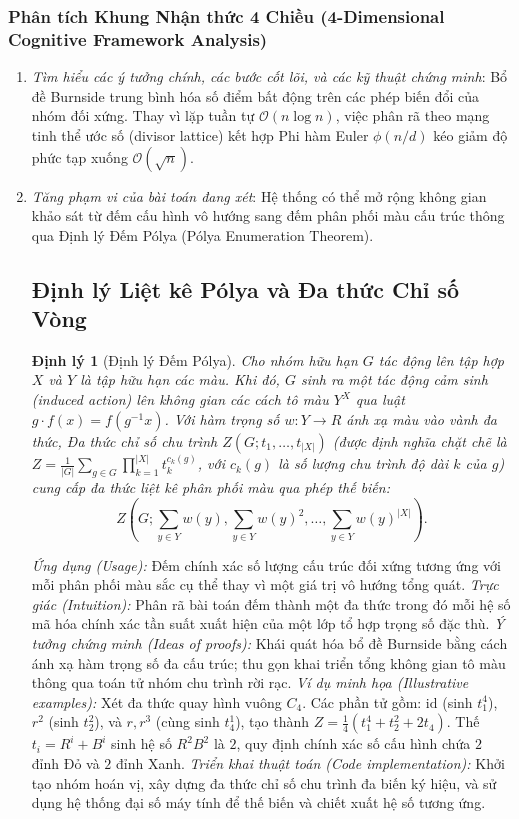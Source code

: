 \documentclass{article}
\newtheorem{dinhly}{Định lý}
\begin{document}
\subsubsection*{Phân tích Khung Nhận thức 4 Chiều (4-Dimensional Cognitive Framework Analysis)}
\begin{enumerate}
 \item \textit{Tìm hiểu các ý tưởng chính, các bước cốt lõi, và các kỹ thuật chứng minh}: Bổ đề Burnside trung bình hóa số điểm bất động trên các phép biến đổi của nhóm đối xứng. Thay vì lặp tuần tự $\mathcal{O}(n \log n)$, việc phân rã theo mạng tinh thể ước số (divisor lattice) kết hợp Phi hàm Euler $\phi(n/d)$ kéo giảm độ phức tạp xuống $\mathcal{O}(\sqrt{n})$.
 \item \textit{Tăng phạm vi của bài toán đang xét}: Hệ thống có thể mở rộng không gian khảo sát từ đếm cấu hình vô hướng sang đếm phân phối màu cấu trúc thông qua Định lý Đếm Pólya (Pólya Enumeration Theorem).

\subsection{Định lý Liệt kê Pólya và Đa thức Chỉ số Vòng}

\begin{dinhly}[Định lý Đếm Pólya]
Cho nhóm hữu hạn $G$ tác động lên tập hợp $X$ và $Y$ là tập hữu hạn các màu. Khi đó, $G$ sinh ra một tác động cảm sinh (induced action) lên không gian các cách tô màu $Y^X$ qua luật $g \cdot f(x) = f(g^{-1}x)$. Với hàm trọng số $w: Y \to R$ ánh xạ màu vào vành đa thức, Đa thức chỉ số chu trình $Z(G; t_1, \dots, t_{|X|})$ (được định nghĩa chặt chẽ là $Z = \frac{1}{|G|} \sum_{g \in G} \prod_{k=1}^{|X|} t_k^{c_k(g)}$, với $c_k(g)$ là số lượng chu trình độ dài $k$ của $g$) cung cấp đa thức liệt kê phân phối màu qua phép thế biến:
\begin{equation*}
 Z(G; \sum_{y \in Y} w(y), \sum_{y \in Y} w(y)^2, \dots, \sum_{y \in Y} w(y)^{|X|}).
\end{equation*}
\end{dinhly}
\emph{Ứng dụng (Usage):} Đếm chính xác số lượng cấu trúc đối xứng tương ứng với mỗi phân phối màu sắc cụ thể thay vì một giá trị vô hướng tổng quát.
\emph{Trực giác (Intuition):} Phân rã bài toán đếm thành một đa thức trong đó mỗi hệ số mã hóa chính xác tần suất xuất hiện của một lớp tổ hợp trọng số đặc thù.
\emph{Ý tưởng chứng minh (Ideas of proofs):} Khái quát hóa bổ đề Burnside bằng cách ánh xạ hàm trọng số đa cấu trúc; thu gọn khai triển tổng không gian tô màu thông qua toán tử nhóm chu trình rời rạc.
\emph{Ví dụ minh họa (Illustrative examples):} Xét đa thức quay hình vuông $C_4$. Các phần tử gồm: $\text{id}$ (sinh $t_1^4$), $r^2$ (sinh $t_2^2$), và $r, r^3$ (cùng sinh $t_4^1$), tạo thành $Z = \frac{1}{4}(t_1^4 + t_2^2 + 2t_4)$. Thế $t_i = R^i + B^i$ sinh hệ số $R^2B^2$ là $2$, quy định chính xác số cấu hình chứa $2$ đỉnh Đỏ và $2$ đỉnh Xanh.
\emph{Triển khai thuật toán (Code implementation):} Khởi tạo nhóm hoán vị, xây dựng đa thức chỉ số chu trình đa biến ký hiệu, và sử dụng hệ thống đại số máy tính để thế biến và chiết xuất hệ số tương ứng.


\end{enumerate}
\end{document}
